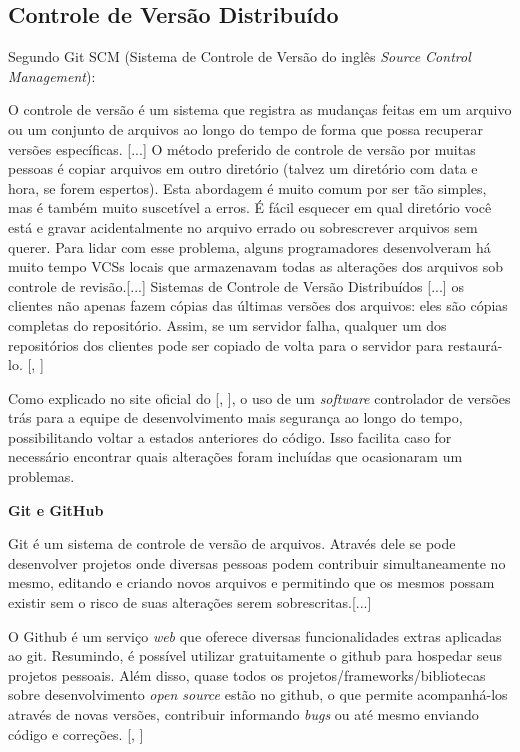 \documentclass[
	12pt,				%
	oneside,			%
	a4paper,			%
	brazil				%
]{abntex2}
\newcommand{\citecustom}[1]{[\citeauthoronline{#1}, \citeyear{#1}]}
\begin{document}
\subsection{Controle de Versão Distribuído}

Segundo Git SCM (Sistema de Controle de Versão do inglês \textit{Source Control Management}):

\begin{citacao}
O controle de versão é um sistema que registra as mudanças feitas em um arquivo ou um conjunto de arquivos ao longo do tempo de forma que possa recuperar versões específicas. [...]
O método preferido de controle de versão por muitas pessoas é copiar arquivos em outro diretório (talvez um diretório com data e hora, se forem espertos). Esta abordagem é muito comum por ser tão simples, mas é também muito suscetível a erros. É fácil esquecer em qual diretório você está e gravar acidentalmente no arquivo errado ou sobrescrever arquivos sem querer. Para lidar com esse problema, alguns programadores desenvolveram há muito tempo VCSs locais que armazenavam todas as alterações dos arquivos sob controle de revisão.[...]
Sistemas de Controle de Versão Distribuídos [...] os clientes não apenas fazem cópias das últimas versões dos arquivos: eles são cópias completas do repositório. Assim, se um servidor falha, qualquer um dos repositórios dos clientes pode ser copiado de volta para o servidor para restaurá-lo. \citecustom{Git2016}
\end{citacao}

Como explicado no site oficial do \citecustom{Git2016}, o uso de um \textit{software} controlador de versões trás para a equipe de desenvolvimento mais segurança ao longo do tempo, possibilitando voltar a estados anteriores do código. Isso facilita caso for necessário encontrar quais alterações foram incluídas que ocasionaram um problemas.

\textbf{Git e GitHub}

\begin{citacao}
Git é um sistema de controle de versão de arquivos. Através dele se pode desenvolver projetos onde diversas pessoas podem contribuir simultaneamente no mesmo, editando e criando novos arquivos e permitindo que os mesmos possam existir sem o risco de suas alterações serem sobrescritas.[...]

O Github é um serviço \textit{web} que oferece diversas funcionalidades extras aplicadas ao git. Resumindo, é possível utilizar gratuitamente o github para hospedar seus projetos pessoais. Além disso, quase todos os projetos/frameworks/bibliotecas sobre desenvolvimento \textit{open source} estão no github, o que permite acompanhá-los através de novas versões, contribuir informando \textit{bugs} ou até mesmo enviando código e correções. \citecustom{Schmitz2015}
\end{citacao}
\end{document}
